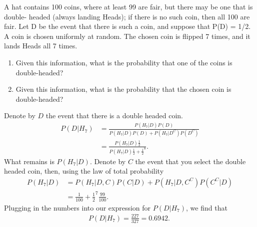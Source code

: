 

\setcounter{theorem}{4}

\begin{exercise} [BH.2.5] 
A hat contains 100 coins, where at least 99 are fair, but there may be one that is double- headed (always landing Heads); if there is no such coin, then all 100 are fair. Let D be the event that there is such a coin, and suppose that P(D) = 1/2. A coin is chosen uniformly at random. The chosen coin is flipped 7 times, and it lands Heads all 7 times.
	\begin{enumerate}
		\item Given this information, what is the probability that one of the coins is double-headed?
		\item Given this information, what is the probability that the chosen coin is double-headed?
	\end{enumerate}
	\begin{solution}
	 	Denote by $D$ the event that there is a double headed coin. 
	\begin{align*}
		P(D|H_{7})& = \frac{P(H_{7}|D)P(D)}{P(H_{7}|D)P(D) + P(H_{7}|D^{C})P(D^{C})}\\
		&=\frac{P(H_{7}|D)\frac{1}{2}}{P(H_{7}|D)\frac{1}{2} + \frac{1}{2}^8}.
	\end{align*}
	What remains is $P(H_{7}|D)$. Denote by $C$ the event that you select the double headed coin, then, using the law of total probability
	\begin{align*}
		P(H_{7}|D) &=P(H_{7}|D,C)P(C|D) + P(H_{7}|D,C^{C})P(C^{C}|D)\\
		& = \frac{1}{100} + \frac{1}{2}^7\frac{99}{100}.
	\end{align*}
	Plugging in the numbers into our expression for $P(D|H_{7})$, we find that
	\begin{align*}
		P(D|H_{7}) = \frac{227}{327} = 0.6942.\
	\end{align*}
\end{solution}
\end{exercise}


